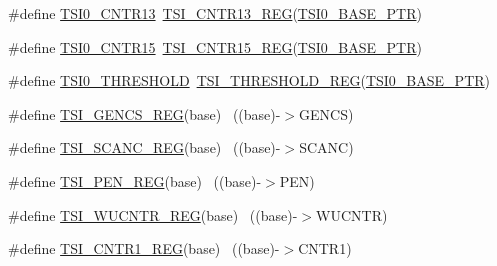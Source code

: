 \begin{DoxyCompactItemize}
\item 
\#define \hyperlink{group___t_s_i___register___accessor___macros_ga4ceecc7d3b2c95a0e7c8ca8e1c5a9ff9}{T\+S\+I0\+\_\+\+C\+N\+T\+R13}~\hyperlink{group___t_s_i___register___accessor___macros_ga4781f0cae7aee00361b1d6dd24ebb375}{T\+S\+I\+\_\+\+C\+N\+T\+R13\+\_\+\+R\+EG}(\hyperlink{group___t_s_i___peripheral_gaf98ea1cd15559446e0cfc1ae177751f6}{T\+S\+I0\+\_\+\+B\+A\+S\+E\+\_\+\+P\+TR})
\item 
\#define \hyperlink{group___t_s_i___register___accessor___macros_ga82d9eb7784107b55add2e6abc0e2ff2e}{T\+S\+I0\+\_\+\+C\+N\+T\+R15}~\hyperlink{group___t_s_i___register___accessor___macros_ga6999a403171b9b12a3caa9d5c0da77b6}{T\+S\+I\+\_\+\+C\+N\+T\+R15\+\_\+\+R\+EG}(\hyperlink{group___t_s_i___peripheral_gaf98ea1cd15559446e0cfc1ae177751f6}{T\+S\+I0\+\_\+\+B\+A\+S\+E\+\_\+\+P\+TR})
\item 
\#define \hyperlink{group___t_s_i___register___accessor___macros_gacb58ac9e8fdf37c03ddaf95985740d18}{T\+S\+I0\+\_\+\+T\+H\+R\+E\+S\+H\+O\+LD}~\hyperlink{group___t_s_i___register___accessor___macros_ga2eef7cbc055e4e7eead54c59a1bda753}{T\+S\+I\+\_\+\+T\+H\+R\+E\+S\+H\+O\+L\+D\+\_\+\+R\+EG}(\hyperlink{group___t_s_i___peripheral_gaf98ea1cd15559446e0cfc1ae177751f6}{T\+S\+I0\+\_\+\+B\+A\+S\+E\+\_\+\+P\+TR})
\item 
\#define \hyperlink{group___t_s_i___register___accessor___macros_gacb2292491464fa55b36996380b09077f}{T\+S\+I\+\_\+\+G\+E\+N\+C\+S\+\_\+\+R\+EG}(base)                                        ~((base)-\/$>$G\+E\+N\+CS)
\item 
\#define \hyperlink{group___t_s_i___register___accessor___macros_gaa04f34529d4fc762bc30470edc1d5f38}{T\+S\+I\+\_\+\+S\+C\+A\+N\+C\+\_\+\+R\+EG}(base)                                        ~((base)-\/$>$S\+C\+A\+NC)
\item 
\#define \hyperlink{group___t_s_i___register___accessor___macros_gaf538119a9d15bb7ecc599ef0c8dccec8}{T\+S\+I\+\_\+\+P\+E\+N\+\_\+\+R\+EG}(base)                                            ~((base)-\/$>$P\+EN)
\item 
\#define \hyperlink{group___t_s_i___register___accessor___macros_ga49c16fb23aea66326627e034f76787c8}{T\+S\+I\+\_\+\+W\+U\+C\+N\+T\+R\+\_\+\+R\+EG}(base)                                      ~((base)-\/$>$W\+U\+C\+N\+TR)
\item 
\#define \hyperlink{group___t_s_i___register___accessor___macros_ga7c64ae8bd21ec584c53351a1c55b6346}{T\+S\+I\+\_\+\+C\+N\+T\+R1\+\_\+\+R\+EG}(base)                                        ~((base)-\/$>$C\+N\+T\+R1)

\end{DoxyCompactItemize}
